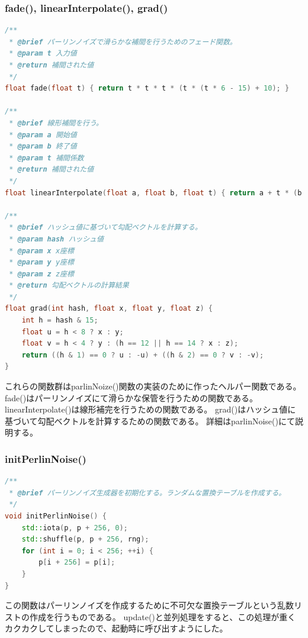 \documentclass[uplatex,dvipdfmx,a4paper]{jsarticle}
\begin{document}
\hypertarget{func:perlin_helpers}{}\subsubsection{fade(), linearInterpolate(), grad()}\label{func:perlin_helpers}
\begin{lstlisting}[language=C++, caption={パーリンノイズ用ヘルパー関数}, label={lst:perlin_helpers_detail}]
/**
 * @brief パーリンノイズで滑らかな補間を行うためのフェード関数。
 * @param t 入力値
 * @return 補間された値
 */
float fade(float t) { return t * t * t * (t * (t * 6 - 15) + 10); }

/**
 * @brief 線形補間を行う。
 * @param a 開始値
 * @param b 終了値
 * @param t 補間係数
 * @return 補間された値
 */
float linearInterpolate(float a, float b, float t) { return a + t * (b - a); }

/**
 * @brief ハッシュ値に基づいて勾配ベクトルを計算する。
 * @param hash ハッシュ値
 * @param x x座標
 * @param y y座標
 * @param z z座標
 * @return 勾配ベクトルの計算結果
 */
float grad(int hash, float x, float y, float z) {
    int h = hash & 15;
    float u = h < 8 ? x : y;
    float v = h < 4 ? y : (h == 12 || h == 14 ? x : z);
    return ((h & 1) == 0 ? u : -u) + ((h & 2) == 0 ? v : -v);
}
\end{lstlisting}
これらの関数群はparlinNoize()関数の実装のために作ったヘルパー関数である。
fade()はパーリンノイズにて滑らかな保管を行うための関数である。
linearInterpolate()は線形補完を行うための関数である。
grad()はハッシュ値に基づいて勾配ベクトルを計算するための関数である。
詳細はparlinNoise()にて説明する。

\hypertarget{func:initPerlinNoise}{}\subsubsection{initPerlinNoise()}\label{func:initPerlinNoise}
\begin{lstlisting}[language=C++, caption={initPerlinNoise() 関数}, label={lst:initPerlinNoise_detail}]
/**
 * @brief パーリンノイズ生成器を初期化する。ランダムな置換テーブルを作成する。
 */
void initPerlinNoise() {
    std::iota(p, p + 256, 0);
    std::shuffle(p, p + 256, rng);
    for (int i = 0; i < 256; ++i) {
        p[i + 256] = p[i];
    }
}
\end{lstlisting}
この関数はパーリンノイズを作成するために不可欠な置換テーブルという乱数リストの作成を行うものである。
update()と並列処理をすると、この処理が重くカクカクしてしまったので、起動時に呼び出すようにした。
\end{document}
